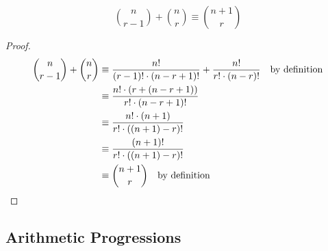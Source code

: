 \begin{lemma} \label{lem_bin_coef_sum}
\begin{equation*}
\binom n{r - 1} + \binom nr \equiv \binom{n + 1} r
\end{equation*}
\end{lemma}
\begin{proof}
\begin{align*}
\binom n{r - 1} + \binom nr &\equiv \frac{n!}{(r - 1)! \cdot (n - r + 1)!}
                                 + \frac{n!}{r! \cdot (n - r)!}
                                    \quad \text{by definition} \\
    &\equiv \frac{n!\cdot(r + (n - r + 1))}{r! \cdot (n - r + 1)!} \\
    &\equiv \frac{n! \cdot (n + 1)}{r! \cdot ((n + 1) - r)!} \\
    &\equiv \frac{(n + 1)!}{r! \cdot ((n + 1) - r)!} \\
    &\equiv \binom{n + 1} r \quad \text{by definition} \qedhere
\end{align*}
\end{proof}

\subsection{Arithmetic Progressions} \label{sec_seq_AP}

